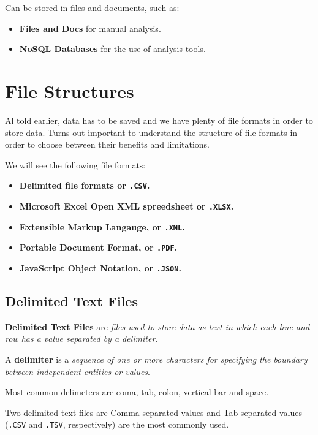 \documentclass[../../ibm_data_analysis.tex]{subfiles}
\begin{document}
    Can be stored in files and documents, such as:
    \begin{itemize}
        \item \textbf{Files and Docs} for manual analysis.
        \item \textbf{NoSQL Databases} for the use of analysis tools.
    \end{itemize}

    \section{File Structures}

    Al told earlier, data has to be saved and we have plenty of file formats in order to store data. Turns out important to understand the structure of file formats in order to choose between their benefits and limitations.

    We will see the following file formats:
    \begin{itemize}
        \item \textbf{Delimited file formats or \lstinline|.CSV|.}
        \item \textbf{Microsoft Excel Open XML spreedsheet or \lstinline|.XLSX|.}
        \item \textbf{Extensible Markup Langauge, or \lstinline|.XML|.}
        \item \textbf{Portable Document Format, or \lstinline|.PDF|.}
        \item \textbf{JavaScript Object Notation, or \lstinline|.JSON|.} 
    \end{itemize}

    \subsection{Delimited Text Files}

    \begin{mydef}
        \textbf{Delimited Text Files} are \textit{files used to store data as text in which each line and row has a value separated by a delimiter}.

        A \textbf{delimiter} is a \textit{sequence of one or more characters for specifying the boundary between independent entities or values}.
    \end{mydef}

    Most common delimeters are coma, tab, colon, vertical bar and space.

    \begin{exa}
        Two delimited text files are Comma-separated values and Tab-separated values (\lstinline|.CSV| and \lstinline|.TSV|, respectively) are the most commonly used.
    \end{exa}
\end{document}
